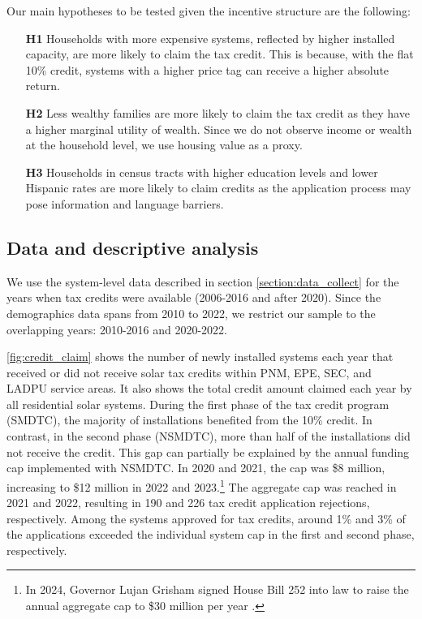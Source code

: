 \documentclass[11pt,twoside,letterpaper]{article}
\begin{document}
Our main hypotheses to be tested given the incentive structure are the following:
\begin{itemize}
    \item[\textbf{H1}] Households with more expensive systems, reflected by higher installed capacity, are more likely to claim the tax credit. This is because, with the flat 10\% credit, systems with a higher price tag can receive a higher absolute return.
    \item[\textbf{H2}] Less wealthy families are more likely to claim the tax credit as they have a higher marginal utility of wealth. Since we do not observe income or wealth at the household level, we use housing value as a proxy.
    \item[\textbf{H3}] Households in census tracts with higher education levels and lower Hispanic rates are more likely to claim credits as the application process may pose information and language barriers.
\end{itemize}

\subsection{Data and descriptive analysis}

We use the system-level data described in section \ref{section:data_collect} for the years when tax credits were available (2006-2016 and after 2020). Since the demographics data spans from 2010 to 2022, we restrict our sample to the overlapping years: 2010-2016 and 2020-2022. 

\autoref{fig:credit_claim} shows the number of newly installed systems each year that received or did not receive solar tax credits within PNM, EPE, SEC, and LADPU service areas. It also shows the total credit amount claimed each year by all residential solar systems. During the first phase of the tax credit program (SMDTC), the majority of installations benefited from the 10\% credit. In contrast, in the second phase (NSMDTC), more than half of the installations did not receive the credit. This gap can partially be explained by the annual funding cap implemented with NSMDTC. In 2020 and 2021, the cap was \$8 million, increasing to \$12 million in 2022 and 2023.\footnote{In 2024, Governor Lujan Grisham signed House Bill 252 into law to raise the annual aggregate cap to \$30 million per year \parencite{newsolarcap}.} The aggregate cap was reached in 2021 and 2022, resulting in 190 and 226 tax credit application rejections, respectively. Among the systems approved for tax credits, around 1\% and 3\% of the applications exceeded the individual system cap in the first and second phase, respectively.
\end{document}
